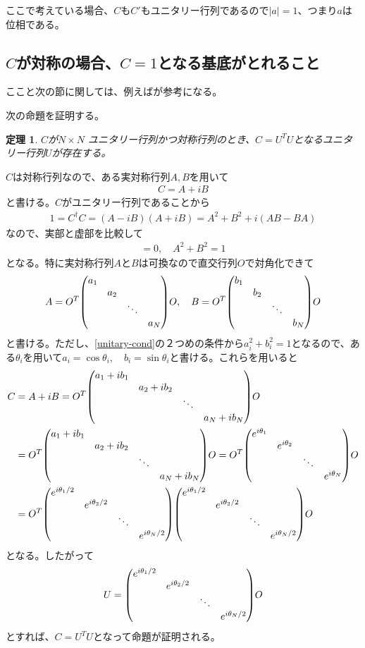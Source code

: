 \documentclass[12pt,a4paper]{jlreq}
\newtheorem{theo}{定理}
\begin{document}
ここで考えている場合、$C$も$C'$もユニタリー行列であるので$|a|=1$、つまり$a$は位相である。


\subsection{$C$が対称の場合、$C=1$となる基底がとれること}
\label{app:symmetric}
ここと次の節に関しては、例えば\cite{Zumino}が参考になる。

次の命題を証明する。
\begin{theo}
  $C$が$N\times N$ ユニタリー行列かつ対称行列のとき、$C=U^TU$となるユニタリー行列$U$が存在する。
\end{theo}

$C$は対称行列なので、ある実対称行列$A,B$を用いて
\begin{align*}
  C=A+iB
\end{align*}
と書ける。$C$がユニタリー行列であることから
\begin{align*}
  1=C^{\dag}C=(A-iB)(A+iB)=A^2+B^2+i(AB-BA)
\end{align*}
なので、実部と虚部を比較して
\begin{align}
  [A,B]=0,\quad A^2+B^2=1
  \label{unitary-cond}
\end{align}
となる。特に実対称行列$A$と$B$は可換なので直交行列$O$で対角化できて
\begin{align*}
  A=O^T 
  \mqty(\dmat{a_1,a_2,\ddots,a_N})
  O,\quad
  B=O^T 
  \mqty(\dmat{b_1,b_2,\ddots,b_N})
  O
\end{align*}
と書ける。ただし、\eqref{unitary-cond}の２つめの条件から$a_i^2+b_i^2=1$となるので、ある$\theta_i$を用いて$a_i=\cos\theta_i,\quad b_i=\sin \theta_i$と書ける。これらを用いると
\begin{align}
  C&=A+iB
  =O^{T}
  \mqty(\dmat{a_1+ib_1,a_2+ib_2,\ddots,a_N+ib_N})
  O\\
  &=O^T
  \mqty(\dmat{a_1+ib_1,a_2+ib_2,\ddots,a_N+ib_N})
  O
  =O^T
  \mqty(\dmat{e^{i\theta_1},e^{i\theta_2},\ddots,e^{i\theta_N}})
  O\\
  &=O^T
  \mqty(\dmat{e^{i\theta_1/2},e^{i\theta_2/2},\ddots,e^{i\theta_N/2}})
  \mqty(\dmat{e^{i\theta_1/2},e^{i\theta_2/2},\ddots,e^{i\theta_N/2}})
  O
\end{align}
となる。したがって
\begin{align*}
  U=  \mqty(\dmat{e^{i\theta_1/2},e^{i\theta_2/2},\ddots,e^{i\theta_N/2}})
  O
\end{align*}
とすれば、$C=U^TU$となって命題が証明される。
\end{document}
